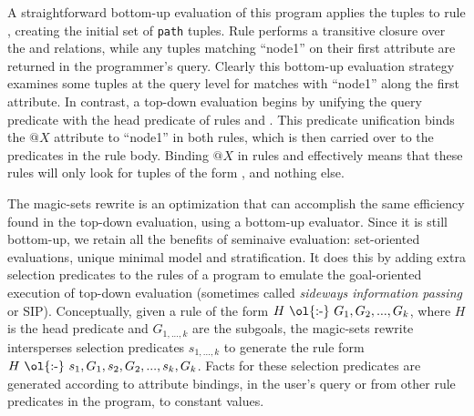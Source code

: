 A straightforward bottom-up evaluation of this program applies the 
tuples to rule , creating the initial set of {\tt path} tuples.  Rule
 performs a transitive closure over the  and 
relations, while any  tuples matching ``node1'' on their first
attribute are returned in the programmer's query.  Clearly this bottom-up
evaluation strategy examines some  tuples at the query level for
matches with ``node1'' along the first attribute.  In contrast, a top-down
evaluation begins by unifying the query predicate with the head predicate of
rules  and .  This  predicate unification binds the $@X$
attribute to ``node1'' in both rules, which is then carried over to the
predicates in the rule body.  Binding $@X$ in rules  and 
effectively means that these rules will only look for tuples of the form
, and nothing else.

The magic-sets rewrite is an optimization that can accomplish the same
efficiency found in the top-down evaluation, using a bottom-up evaluator.
Since it is still bottom-up, we retain all the benefits of seminaive
evaluation: set-oriented evaluations, unique minimal model and stratification.
It does this by adding extra selection predicates to the rules of a program to
emulate the goal-oriented execution of top-down evaluation (sometimes called
\emph{sideways information passing} or SIP).  Conceptually, given a rule of the
form $H\ \text{\ol{:-}}\ G_1, G_2, ..., G_k$, where $H$ is the head predicate
and $G_{1,...,k}$ are the subgoals, the magic-sets rewrite intersperses
selection predicates $s_{1,...,k}$ to generate the rule form $H\
\text{\ol{:-}}\ s_1, G_1, s_2, G_2, ..., s_{k}, G_k$.  Facts for these
selection predicates are generated according to attribute bindings, in the
user's query or from other rule predicates in the program, to constant values.

